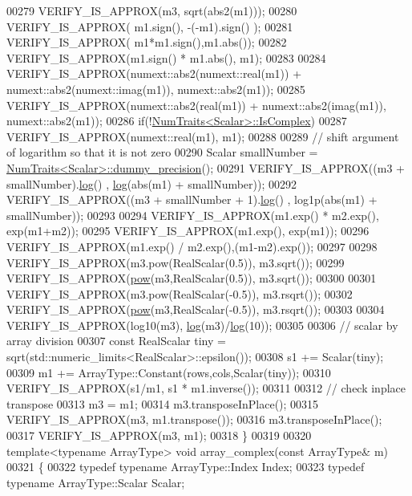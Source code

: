 \begin{DoxyCode}
00279   VERIFY\_IS\_APPROX(m3, sqrt(abs2(m1)));
00280   VERIFY\_IS\_APPROX( m1.sign(), -(-m1).sign() );
00281   VERIFY\_IS\_APPROX( m1*m1.sign(),m1.abs());
00282   VERIFY\_IS\_APPROX(m1.sign() * m1.abs(), m1);
00283 
00284   VERIFY\_IS\_APPROX(numext::abs2(numext::real(m1)) + numext::abs2(numext::imag(m1)), numext::abs2(m1));
00285   VERIFY\_IS\_APPROX(numext::abs2(real(m1)) + numext::abs2(imag(m1)), numext::abs2(m1));
00286   \textcolor{keywordflow}{if}(!\hyperlink{group___core___module_struct_eigen_1_1_num_traits}{NumTraits<Scalar>::IsComplex})
00287     VERIFY\_IS\_APPROX(numext::real(m1), m1);
00288 
00289   \textcolor{comment}{// shift argument of logarithm so that it is not zero}
00290   Scalar smallNumber = \hyperlink{group___core___module_struct_eigen_1_1_num_traits}{NumTraits<Scalar>::dummy\_precision}();
00291   VERIFY\_IS\_APPROX((m3 + smallNumber).\hyperlink{structlog}{log}() , \hyperlink{structlog}{log}(abs(m1) + smallNumber));
00292   VERIFY\_IS\_APPROX((m3 + smallNumber + 1).\hyperlink{structlog}{log}() , log1p(abs(m1) + smallNumber));
00293 
00294   VERIFY\_IS\_APPROX(m1.exp() * m2.exp(), exp(m1+m2));
00295   VERIFY\_IS\_APPROX(m1.exp(), exp(m1));
00296   VERIFY\_IS\_APPROX(m1.exp() / m2.exp(),(m1-m2).exp());
00297 
00298   VERIFY\_IS\_APPROX(m3.pow(RealScalar(0.5)), m3.sqrt());
00299   VERIFY\_IS\_APPROX(\hyperlink{group___core___module_ab6dc101d82e8228a19a8840e3a29c1c9}{pow}(m3,RealScalar(0.5)), m3.sqrt());
00300 
00301   VERIFY\_IS\_APPROX(m3.pow(RealScalar(-0.5)), m3.rsqrt());
00302   VERIFY\_IS\_APPROX(\hyperlink{group___core___module_ab6dc101d82e8228a19a8840e3a29c1c9}{pow}(m3,RealScalar(-0.5)), m3.rsqrt());
00303 
00304   VERIFY\_IS\_APPROX(log10(m3), \hyperlink{structlog}{log}(m3)/\hyperlink{structlog}{log}(10));
00305 
00306   \textcolor{comment}{// scalar by array division}
00307   \textcolor{keyword}{const} RealScalar tiny = sqrt(std::numeric\_limits<RealScalar>::epsilon());
00308   s1 += Scalar(tiny);
00309   m1 += ArrayType::Constant(rows,cols,Scalar(tiny));
00310   VERIFY\_IS\_APPROX(s1/m1, s1 * m1.inverse());
00311 
00312   \textcolor{comment}{// check inplace transpose}
00313   m3 = m1;
00314   m3.transposeInPlace();
00315   VERIFY\_IS\_APPROX(m3, m1.transpose());
00316   m3.transposeInPlace();
00317   VERIFY\_IS\_APPROX(m3, m1);
00318 \}
00319 
00320 \textcolor{keyword}{template}<\textcolor{keyword}{typename} ArrayType> \textcolor{keywordtype}{void} array\_complex(\textcolor{keyword}{const} ArrayType& m)
00321 \{
00322   \textcolor{keyword}{typedef} \textcolor{keyword}{typename} ArrayType::Index Index;
00323   \textcolor{keyword}{typedef} \textcolor{keyword}{typename} ArrayType::Scalar Scalar;

\end{DoxyCode}
